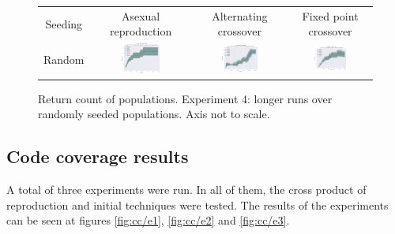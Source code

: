 \documentclass{article}
\begin{document}
\begin{landscape}
\begin{figure}[t]
\begin{center}
\begin{tabular}{c c c c}
    Seeding & Asexual reproduction & Alternating crossover & Fixed point crossover \\
    Random & \includegraphics[align=c,width=0.42\textwidth]{rc/el/1} & \includegraphics[align=c,width=0.42\textwidth]{rc/el/2} & \includegraphics[align=c,width=0.42\textwidth]{rc/el/3} \\
\end{tabular}
\end{center}
\caption{Return count of populations. Experiment 4: longer runs over randomly seeded populations. Axis not to scale.}
\label{fig:rc/el}
\end{figure}
\end{landscape}
\restoregeometry
\pagestyle{plain}

\subsection{Code coverage results}
A total of three experiments were run. In all of them, the cross product of reproduction and initial techniques were tested. The results of the experiments can be seen at figures \ref{fig:cc/e1}, \ref{fig:cc/e2} and \ref{fig:cc/e3}.
\end{document}
